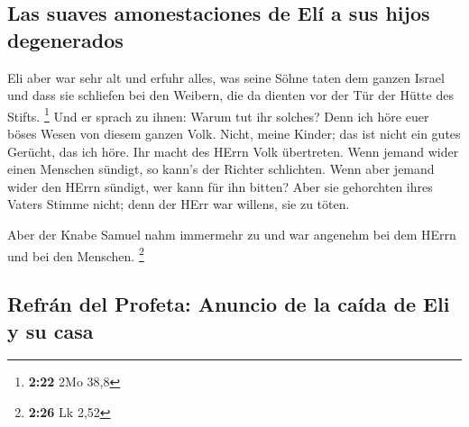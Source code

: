 \hypertarget{las-suaves-amonestaciones-de-eluxed-a-sus-hijos-degenerados}{%
\subsection{Las suaves amonestaciones de Elí a sus hijos
degenerados}\label{las-suaves-amonestaciones-de-eluxed-a-sus-hijos-degenerados}}

 Eli aber war sehr alt und erfuhr alles, was seine Söhne
taten dem ganzen Israel und dass sie schliefen bei den Weibern, die da
dienten vor der Tür der Hütte des Stifts. \footnote{\textbf{2:22} 2Mo
  38,8}  Und er sprach zu ihnen: Warum tut ihr solches?
Denn ich höre euer böses Wesen von diesem ganzen Volk. 
Nicht, meine Kinder; das ist nicht ein gutes Gerücht, das ich höre. Ihr
macht des HErrn Volk übertreten.  Wenn jemand wider einen
Menschen sündigt, so kann's der Richter schlichten. Wenn aber jemand
wider den HErrn sündigt, wer kann für ihn bitten? Aber sie gehorchten
ihres Vaters Stimme nicht; denn der HErr war willens, sie zu töten.

 Aber der Knabe Samuel nahm immermehr zu und war angenehm
bei dem HErrn und bei den Menschen. \footnote{\textbf{2:26} Lk 2,52}

\hypertarget{refruxe1n-del-profeta-anuncio-de-la-cauxedda-de-eli-y-su-casa}{%
\subsection{Refrán del Profeta: Anuncio de la caída de Eli y su
casa}\label{refruxe1n-del-profeta-anuncio-de-la-cauxedda-de-eli-y-su-casa}}

